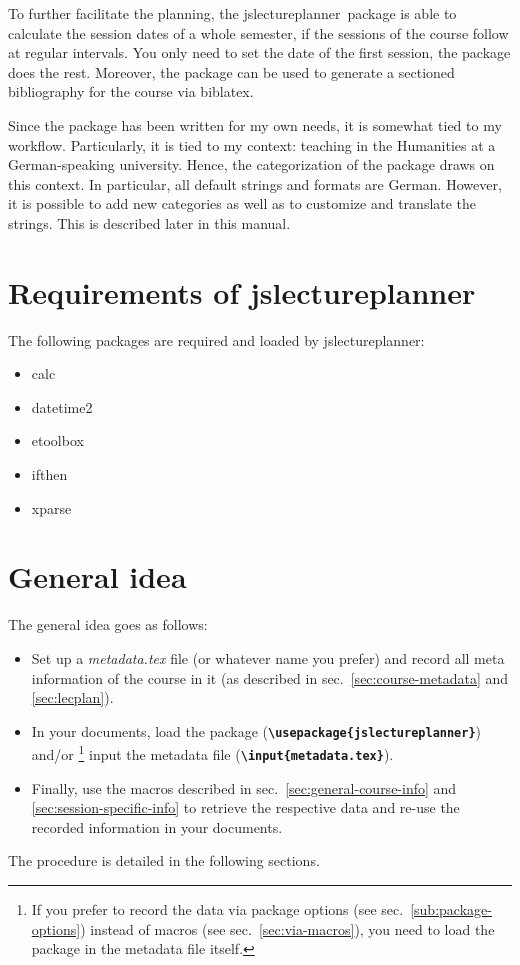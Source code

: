 \documentclass[english]{article}
\newcommand*\jmacro[1]{\textbf{\texttt{#1}}}
\newcommand*\jcsmacro[1]{\jmacro{\textbackslash{#1}}}
\newcommand*\jslp{\textsf{jslectureplanner}}
\begin{document}
To further facilitate the planning, the \jslp\ package
is able to calculate the session dates of a whole semester, if the sessions
of the course follow at regular intervals.
You only need to set the date of the first session, the package does
the rest. Moreover, the package can be used to generate a sectioned
bibliography for the course via \textsf{biblatex}.

Since the package has been written for my own needs, it is somewhat tied
to my workflow. Particularly, it is tied to my context: teaching in
the Humanities at a German-speaking university. Hence, the categorization
of the package draws on this context. In particular, all default strings and
formats are German. However, it is possible to add new categories as
well as to customize and translate the strings.
This is described later in this manual.

\section{Requirements of \jslp}\label{sec:req-jslp}

The following packages are required and loaded by \jslp:
\begin{itemize}
 \setlength\itemsep{2pt}
 \item \textsf{calc}
 \item \textsf{datetime2}
 \item \textsf{etoolbox}
 \item \textsf{ifthen}
 \item \textsf{xparse}
\end{itemize}
\pagebreak

\section{General idea}

The general idea goes as follows:
\begin{itemize}
\item Set up a \emph{metadata.tex} file (or whatever name you prefer) and
record all meta information of the course in it (as described in sec.~\ref{sec:course-metadata}
and \ref{sec:lecplan}).
\item In your documents, load the package (\jcsmacro{usepackage\{jslectureplanner\}})
and/or%
\footnote{If you prefer to record the data via package options
(see sec.~\ref{sub:package-options}) instead of macros (see sec.~\ref{sec:via-macros}),
you need to load the package in the metadata file itself.}
 input the metadata file (\jcsmacro{input\{metadata.tex\}}).
\item Finally, use the macros described in sec.~\ref{sec:general-course-info}
and \ref{sec:session-specific-info} to retrieve the respective data and re-use
the recorded information in your documents.
\end{itemize}
The procedure is detailed in the following sections.
\end{document}
